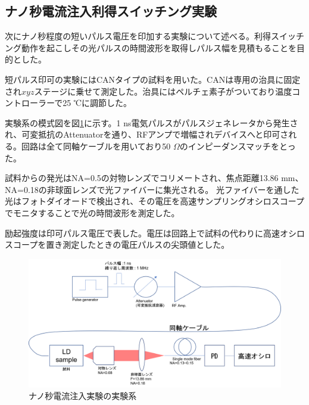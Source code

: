 \subsection{ナノ秒電流注入利得スイッチング実験}%
次にナノ秒程度の短いパルス電圧を印加する実験について述べる。利得スイッチング動作を起こしその光パルスの時間波形を取得しパルス幅を見積もることを目的とした。

短パルス印可の実験にはCANタイプの試料を用いた。CANは専用の治具に固定され$xyz$ステージに乗せて測定した。治具にはペルチェ素子がついており温度コントローラーで25 ℃に調節した。


実験系の模式図を図\ref{fig:fig_2_3_GS_setup}に示す。1 ns電気パルスがパルスジェネレータから発生され、可変抵抗のAttenuatorを通り、RFアンプで増幅されデバイスへと印可される。回路は全て同軸ケーブルを用いており50 $\Omega$のインピーダンスマッチをとった。

試料からの発光はNA=0.5の対物レンズでコリメートされ、焦点距離13.86 mm、NA=0.18の非球面レンズで光ファイバーに集光される。
光ファイバーを通した光はフォトダイオードで検出され、その電圧を高速サンプリングオシロスコープでモニタすることで光の時間波形を測定した。

励起強度は印可パルス電圧で表した。電圧は回路上で試料の代わりに高速オシロスコープを置き測定したときの電圧パルスの尖頭値とした。
\begin{figure}[h]
	\includegraphics[width=15cm]{figure/fig_2_3_GS_setup.png}
	\caption{ナノ秒電流注入実験の実験系}
	\label{fig:fig_2_3_GS_setup}
\end{figure}


